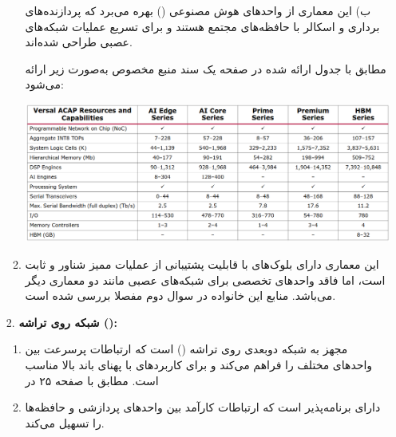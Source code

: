 \begin{qsolve}
	\begin{enumerate}
		\item [ ]
		\begin{enumerate} 
			\item [ب)]
			 این معماری از واحدهای هوش مصنوعی () بهره می‌برد که پردازنده‌های برداری و اسکالر با حافظه‌های مجتمع هستند و برای تسریع عملیات شبکه‌های عصبی طراحی شده‌اند.
			\cite{ref2}
			
			مطابق با جدول ارائه شده در صفحه یک سند \cite{ref4} منبع مخصوص  به‌صورت زیر ارائه می‌شود:
			
			\begin{center}
				\includegraphics*[width=1\linewidth]{pics/img18.png}
				\label{واحد‌های پردازشی موجود در Versal ACAP}
			\end{center}
			
			
			\item 
			 این معماری دارای بلوک‌های  با قابلیت پشتیبانی از عملیات ممیز شناور و ثابت است، اما فاقد واحدهای تخصصی برای شبکه‌های عصبی مانند دو معماری دیگر می‌باشد.
			\cite{ref3}
			منابع این خانواده در سوال دوم مفصلا بررسی شده است.
		\end{enumerate}
		
		\item [2.]
		\textbf{شبکه روی تراشه ():}
		\begin{enumerate}
			\item 
			 مجهز به شبکه دو‌بعدی روی تراشه () است که ارتباطات پرسرعت بین واحدهای مختلف را فراهم می‌کند و برای کاربردهای با پهنای باند بالا مناسب است. مطابق با صفحه ۲۵ در \cite{ref1}
		
			
			\item 
			 دارای  برنامه‌پذیر است که ارتباطات کارآمد بین واحدهای پردازشی و حافظه‌ها را تسهیل می‌کند. \cite{ref6}
		

\end{enumerate}
\end{enumerate}
\end{qsolve}
